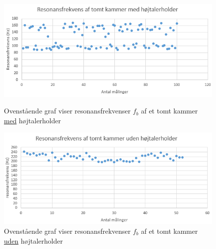 {\begin{figure}[!h]
  \begin{minipage}[b]{1\linewidth}
    \centering
    \includegraphics[width=\linewidth]{tomtkammer(m_holder)}
    \caption{Ovenstående graf viser resonansfrekvenser $f_{b}$ af et tomt kammer \underline{med} højtalerholder}
    \label{fig:tomtkammer(m_holder)}
  \end{minipage}
  \hspace{1cm}
  \begin{minipage}[b]{1\linewidth}
    \centering
    \includegraphics[width=\linewidth]{tomtkammer(u_holder)}
    \caption{Ovenstående graf viser resonansfrekvenser $f_{b}$ af et tomt kammer \underline{uden} højtalerholder}
    \label{fig:tomtkammer(u_holder)}
  \end{minipage}
\end{figure}


}
